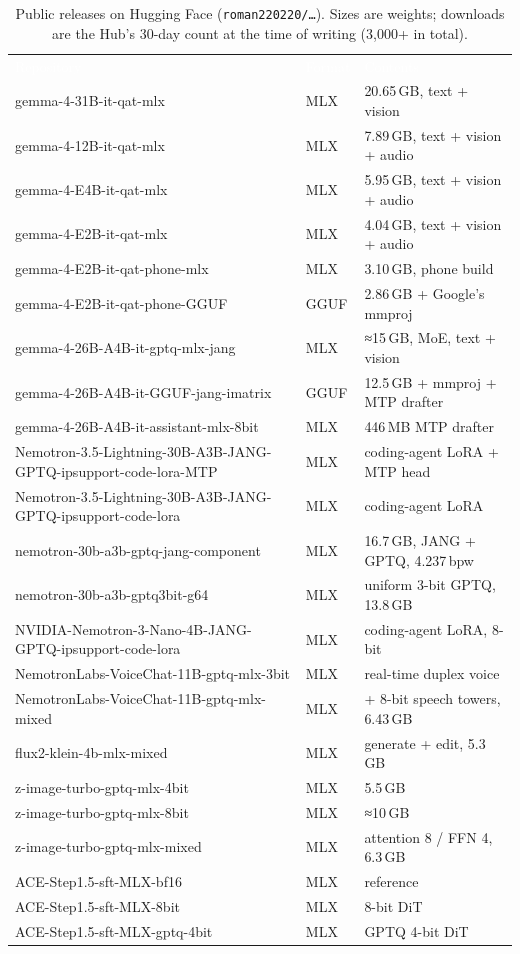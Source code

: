 \documentclass[10pt,letterpaper]{article}
\newcommand{\hd}[1]{\textcolor{white}{\interbold #1}}
\newcommand{\repo}[1]{\texttt{\small #1}}
\begin{document}
\begin{table}[H]
\centering\footnotesize
\caption{Public releases on Hugging Face (\repo{roman220220/\dots}). Sizes are weights; downloads are the Hub's 30-day count at the time of writing (3{,}000+ in total).}
\begin{tabularx}{\linewidth}{>{\raggedright\arraybackslash}p{2.95in}lL}
\hd{Repository} & \hd{Format} & \hd{Contents}\\
gemma-4-31B-it-qat-mlx & MLX & 20.65\,GB, text + vision\\
gemma-4-12B-it-qat-mlx & MLX & 7.89\,GB, text + vision + audio\\
gemma-4-E4B-it-qat-mlx & MLX & 5.95\,GB, text + vision + audio\\
gemma-4-E2B-it-qat-mlx & MLX & 4.04\,GB, text + vision + audio\\
gemma-4-E2B-it-qat-phone-mlx & MLX & 3.10\,GB, phone build\\
gemma-4-E2B-it-qat-phone-GGUF & GGUF & 2.86\,GB + Google's mmproj\\
gemma-4-26B-A4B-it-gptq-mlx-jang & MLX & ≈15\,GB, MoE, text + vision\\
gemma-4-26B-A4B-it-GGUF-jang-imatrix & GGUF & 12.5\,GB + mmproj + MTP drafter\\
gemma-4-26B-A4B-it-assistant-mlx-8bit & MLX & 446\,MB MTP drafter\\
Nemotron-3.5-Lightning-30B-A3B-JANG-GPTQ-ipsupport-code-lora-MTP & MLX & coding-agent LoRA + MTP head\\
Nemotron-3.5-Lightning-30B-A3B-JANG-GPTQ-ipsupport-code-lora & MLX & coding-agent LoRA\\
nemotron-30b-a3b-gptq-jang-component & MLX & 16.7\,GB, JANG + GPTQ, 4.237\,bpw\\
nemotron-30b-a3b-gptq3bit-g64 & MLX & uniform 3-bit GPTQ, 13.8\,GB\\
NVIDIA-Nemotron-3-Nano-4B-JANG-GPTQ-ipsupport-code-lora & MLX & coding-agent LoRA, 8-bit\\
NemotronLabs-VoiceChat-11B-gptq-mlx-3bit & MLX & real-time duplex voice\\
NemotronLabs-VoiceChat-11B-gptq-mlx-mixed & MLX & + 8-bit speech towers, 6.43\,GB\\
flux2-klein-4b-mlx-mixed & MLX & generate + edit, 5.3\,GB\\
z-image-turbo-gptq-mlx-4bit & MLX & 5.5\,GB\\
z-image-turbo-gptq-mlx-8bit & MLX & ≈10\,GB\\
z-image-turbo-gptq-mlx-mixed & MLX & attention 8 / FFN 4, 6.3\,GB\\
ACE-Step1.5-sft-MLX-bf16 & MLX & reference\\
ACE-Step1.5-sft-MLX-8bit & MLX & 8-bit DiT\\
ACE-Step1.5-sft-MLX-gptq-4bit & MLX & GPTQ 4-bit DiT\\
\end{tabularx}
\end{table}
\end{document}
